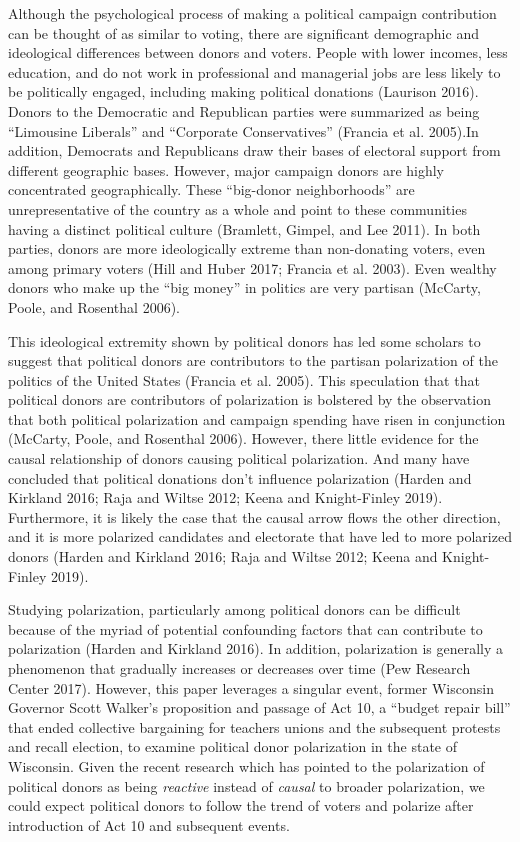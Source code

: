 \documentclass[12pt,]{article}
\begin{document}
Although the psychological process of making a political campaign
contribution can be thought of as similar to voting, there are
significant demographic and ideological differences between donors and
voters. People with lower incomes, less education, and do not work in
professional and managerial jobs are less likely to be politically
engaged, including making political donations (Laurison 2016). Donors to
the Democratic and Republican parties were summarized as being
``Limousine Liberals'' and ``Corporate Conservatives'' (Francia et al.
2005).In addition, Democrats and Republicans draw their bases of
electoral support from different geographic bases. However, major
campaign donors are highly concentrated geographically. These
``big-donor neighborhoods'' are unrepresentative of the country as a
whole and point to these communities having a distinct political culture
(Bramlett, Gimpel, and Lee 2011). In both parties, donors are more
ideologically extreme than non-donating voters, even among primary
voters (Hill and Huber 2017; Francia et al. 2003). Even wealthy donors
who make up the ``big money'' in politics are very partisan (McCarty,
Poole, and Rosenthal 2006).

This ideological extremity shown by political donors has led some
scholars to suggest that political donors are contributors to the
partisan polarization of the politics of the United States (Francia et
al. 2005). This speculation that that political donors are contributors
of polarization is bolstered by the observation that both political
polarization and campaign spending have risen in conjunction (McCarty,
Poole, and Rosenthal 2006). However, there little evidence for the
causal relationship of donors causing political polarization. And many
have concluded that political donations don't influence polarization
(Harden and Kirkland 2016; Raja and Wiltse 2012; Keena and Knight-Finley
2019). Furthermore, it is likely the case that the causal arrow flows
the other direction, and it is more polarized candidates and electorate
that have led to more polarized donors (Harden and Kirkland 2016; Raja
and Wiltse 2012; Keena and Knight-Finley 2019).

Studying polarization, particularly among political donors can be
difficult because of the myriad of potential confounding factors that
can contribute to polarization (Harden and Kirkland 2016). In addition,
polarization is generally a phenomenon that gradually increases or
decreases over time (Pew Research Center 2017). However, this paper
leverages a singular event, former Wisconsin Governor Scott Walker's
proposition and passage of Act 10, a ``budget repair bill'' that ended
collective bargaining for teachers unions and the subsequent protests
and recall election, to examine political donor polarization in the
state of Wisconsin. Given the recent research which has pointed to the
polarization of political donors as being \emph{reactive} instead of
\emph{causal} to broader polarization, we could expect political donors
to follow the trend of voters and polarize after introduction of Act 10
and subsequent events.
\end{document}
